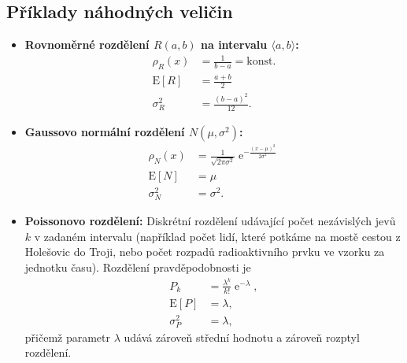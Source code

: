 \documentclass[a4paper,11pt,twoside]{article}
\DeclareMathOperator{\e}{e}
\def\expectation#1{\mathrm{E}\left[#1\right]}
\def\dispersion#1{\sigma_{#1}^{2}}
\theoremstyle{red}
\theoremstyle{green}
\begin{document}
    \subsection{Příklady náhodných veličin}
        \begin{itemize}
            \item {\bf Rovnoměrné rozdělení $R(a,b)$ na intervalu $\langle a,b\rangle$:}
                \begin{align}
                    \label{eq:UniformDistribution}
                    \rho_{R}(x)&=\frac{1}{b-a}=\text{konst.}\\
                    \label{eq:ExpectationR}
                    \expectation{R}&=\frac{a+b}{2}\\
                    \label{eq:DispersionR}
                    \dispersion{R}&=\frac{(b-a)^{2}}{12}.
                \end{align} 

            \item {\bf Gaussovo normální rozdělení $N\left(\mu,\sigma^{2}\right)$:}
                \begin{align}
                    \label{eq:NormalDistribution}
                    \rho_{N}(x)&=\frac{1}{\sqrt{2\pi\sigma^{2}}}\e^{-\frac{(x-\mu)^{2}}{2\sigma^{2}}}\\
                    \expectation{N}&=\mu\\
                    \dispersion{N}&=\sigma^{2}.
                \end{align} 

            \item {\bf Poissonovo rozdělení:}
                Diskrétní rozdělení udávající počet nezávislých jevů $k$ v zadaném intervalu (například počet lidí, které potkáme na mostě cestou z Holešovic do Troji, nebo počet rozpadů radioaktivního prvku ve vzorku za jednotku času).  
                Rozdělení pravděpodobnosti je
                \begin{align}
                    \label{eq:Poisson}
                    P_{k}&=\frac{\lambda^{k}}{k!}\e^{-\lambda},\\
                    \label{eq:ExpectationP}
                    \expectation{P}&=\lambda,\\
                    \label{eq:DispersionP}
                    \dispersion{P}&=\lambda,
                \end{align}
                přičemž parametr $\lambda$ udává zároveň střední hodnotu a zároveň rozptyl rozdělení.
        \end{itemize}
\end{document}
